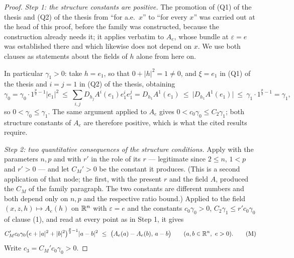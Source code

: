 \begin{proof}
\emph{Step 1: the structure constants are positive.}  The promotion of
(Q1) of the thesis and (Q2) of the thesis from ``for a.e.\ $x$'' to ``for every $x$'' was
carried out at the head of this proof, before the family was constructed,
because the construction already needs it; it applies verbatim to $A_e$, whose
 bundle at $\varepsilon=e$ was established there
and which likewise does not depend on $x$.  We use both clauses as statements
about the fields of $h$ alone from here on.

In particular $\gamma_1>0$: take $h=e_1$, so that $0+|h|^2=1\ne0$, and
$\xi=e_1$ in (Q1) of the thesis and $i=j=1$ in (Q2) of the thesis, obtaining
\[
\gamma_0=\gamma_0\cdot1^{\frac p2-1}|e_1|^2
\ \le\ \sum_{i,j}D_{h_j}A^i(e_1)e_1^ie_1^j=D_{h_1}A^1(e_1)
\ \le\ \bigl|D_{h_1}A^1(e_1)\bigr|\ \le\ \gamma_1\cdot1^{\frac p2-1}=\gamma_1 ,
\]
so $0<\gamma_0\le\gamma_1$.  The same argument applied to $A_e$ gives
$0<c_0\gamma_0\le C_2\gamma_1$; both structure constants of $A_e$ are therefore
positive, which is what the cited results require.

\emph{Step 2: two quantitative consequences of the structure conditions.}  Apply
 with the parameters $n,p$ and with $r'$ in
the role of its $r$ --- legitimate since $2\le n$, $1<p$ and $r'>0$ --- and let
$C_M'>0$ be the constant it produces.  (This is a second application of that
node; the first, with the present $r$ and the field $A$, produced the $C_M$ of
the family paragraph.  The two constants are different numbers and both depend
only on $n,p$ and the respective ratio bound.)  Applied to the field
$(x,z,h)\mapsto A_e(h)$ on $\mathbb{R}^n$ with $\varepsilon=e$ and the constants
$c_0\gamma_0>0$, $C_2\gamma_1\le r'c_0\gamma_0$ of clause (1), and read at every
point as in Step 1, it gives
\[
C_M'c_0\gamma_0\bigl(e+|a|^2+|b|^2\bigr)^{\frac p2-1}|a-b|^2
\ \le\ \bigl(A_e(a)-A_e(b),\,a-b\bigr)
\qquad(a,b\in\mathbb{R}^n,\ e>0).
\tag{M}
\]
Write $c_3=C_M'c_0\gamma_0>0$.


\end{proof}
